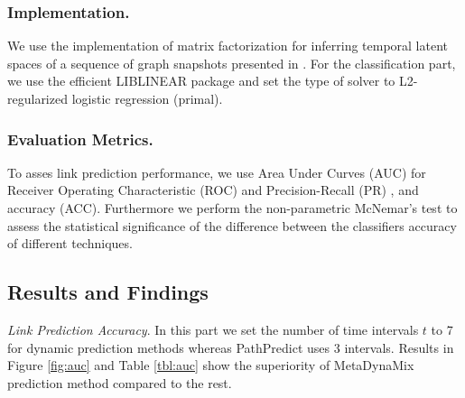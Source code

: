 \subsubsection{Implementation.} We use the implementation of matrix factorization for inferring temporal latent spaces of a sequence of graph snapshots presented in \cite{Zhu2016}. For the classification part, we use the efficient LIBLINEAR \cite{fan2008liblinear} package and set the type of solver to L2-regularized logistic regression (primal). %


\subsubsection{Evaluation Metrics.} 

To asses link prediction performance, we use Area Under Curves (AUC) for Receiver Operating Characteristic (ROC) and Precision-Recall (PR) \cite{davis2006relationship}, and accuracy (ACC). %
Furthermore we perform the non-parametric McNemar's test \cite{mcnemar1947note} to assess the statistical significance of the difference between the classifiers accuracy of different techniques.

\subsection{Results and Findings}

\textit{Link Prediction Accuracy}. In this part we set the number of time intervals $t$ to 7 for dynamic prediction methods whereas PathPredict uses 3 intervals. Results in Figure \ref{fig:auc} and Table \ref{tbl:auc} show the superiority of MetaDynaMix prediction method compared to the rest.


